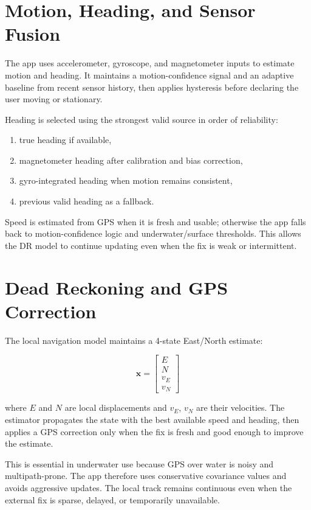 \documentclass[conference]{IEEEtran}
\begin{document}
\section{Motion, Heading, and Sensor Fusion}
The app uses accelerometer, gyroscope, and magnetometer inputs to estimate motion and heading. It maintains a motion-confidence signal and an adaptive baseline from recent sensor history, then applies hysteresis before declaring the user moving or stationary.

Heading is selected using the strongest valid source in order of reliability:

\begin{enumerate}
\item true heading if available,
\item magnetometer heading after calibration and bias correction,
\item gyro-integrated heading when motion remains consistent,
\item previous valid heading as a fallback.
\end{enumerate}

Speed is estimated from GPS when it is fresh and usable; otherwise the app falls back to motion-confidence logic and underwater/surface thresholds. This allows the DR model to continue updating even when the fix is weak or intermittent.

\section{Dead Reckoning and GPS Correction}
The local navigation model maintains a 4-state East/North estimate:

\begin{equation}
\mathbf{x} = \begin{bmatrix}
E \\
N \\
v_E \\
v_N
\end{bmatrix}
\end{equation}

where $E$ and $N$ are local displacements and $v_E$, $v_N$ are their velocities. The estimator propagates the state with the best available speed and heading, then applies a GPS correction only when the fix is fresh and good enough to improve the estimate.

This is essential in underwater use because GPS over water is noisy and multipath-prone. The app therefore uses conservative covariance values and avoids aggressive updates. The local track remains continuous even when the external fix is sparse, delayed, or temporarily unavailable.
\end{document}
